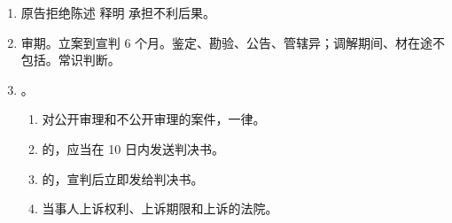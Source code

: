 \begin{enumerate}
\begin{enumerate}
\begin{enumerate}
                \end{enumerate}
          \item 原告拒绝陈述 \yjt 释明 \yjt 承担不利后果。
          \item 审期。立案到宣判 6 个月。鉴定、勘验、公告、管辖异；调解期间、材在途不包括。常识判断。
          \item {}。
                \begin{enumerate}
                  \item 对公开审理和不公开审理的案件，一律。
                  \item {}的，应当在 10 日内发送判决书。
                  \item {}的，宣判后立即发给判决书。
                  \item {}当事人上诉权利、上诉期限和上诉的法院。
                \end{enumerate}
        \end{enumerate}


\end{enumerate}
